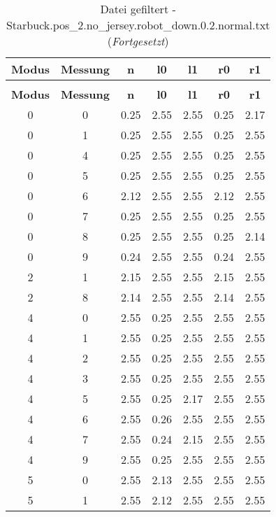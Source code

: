 \begin{longtable}{|c|c||c||c|c||c|c|}
	\caption{Datei gefiltert - Starbuck.pos\_2.no\_jersey.robot\_down.0.2.normal.txt} \label{tab:Starbuck.pos-2.no-jersey.robot-down.0.2.normal.txt} \\ \hline
	\textbf{Modus} & \textbf{Messung} & \textbf{n} & \textbf{l0} & \textbf{l1} & \textbf{r0} & \textbf{r1}\\ \hline
	\endfirsthead
	\caption[]{Datei gefiltert - Starbuck.pos\_2.no\_jersey.robot\_down.0.2.normal.txt (\emph{Fortgesetzt})} \\ \hline
	\textbf{Modus} & \textbf{Messung} & \textbf{n} & \textbf{l0} & \textbf{l1} & \textbf{r0} & \textbf{r1}\\ \hline
	\endhead
	0 & 0 & 0.25 & 2.55 & 2.55 & 0.25 & 2.17 \\ \hline
	0 & 1 & 0.25 & 2.55 & 2.55 & 0.25 & 2.55 \\ \hline
	0 & 4 & 0.25 & 2.55 & 2.55 & 0.25 & 2.55 \\ \hline
	0 & 5 & 0.25 & 2.55 & 2.55 & 0.25 & 2.55 \\ \hline
	0 & 6 & 2.12 & 2.55 & 2.55 & 2.12 & 2.55 \\ \hline
	0 & 7 & 0.25 & 2.55 & 2.55 & 0.25 & 2.55 \\ \hline
	0 & 8 & 0.25 & 2.55 & 2.55 & 0.25 & 2.14 \\ \hline
	0 & 9 & 0.24 & 2.55 & 2.55 & 0.24 & 2.55 \\ \hline
	2 & 1 & 2.15 & 2.55 & 2.55 & 2.15 & 2.55 \\ \hline
	2 & 8 & 2.14 & 2.55 & 2.55 & 2.14 & 2.55 \\ \hline
	4 & 0 & 2.55 & 0.25 & 2.55 & 2.55 & 2.55 \\ \hline
	4 & 1 & 2.55 & 0.25 & 2.55 & 2.55 & 2.55 \\ \hline
	4 & 2 & 2.55 & 0.25 & 2.55 & 2.55 & 2.55 \\ \hline
	4 & 3 & 2.55 & 0.25 & 2.55 & 2.55 & 2.55 \\ \hline
	4 & 5 & 2.55 & 0.25 & 2.17 & 2.55 & 2.55 \\ \hline
	4 & 6 & 2.55 & 0.26 & 2.55 & 2.55 & 2.55 \\ \hline
	4 & 7 & 2.55 & 0.24 & 2.15 & 2.55 & 2.55 \\ \hline
	4 & 9 & 2.55 & 0.25 & 2.55 & 2.55 & 2.55 \\ \hline
	5 & 0 & 2.55 & 2.13 & 2.55 & 2.55 & 2.55 \\ \hline
	5 & 1 & 2.55 & 2.12 & 2.55 & 2.55 & 2.55 \\ \hline

\end{longtable}
